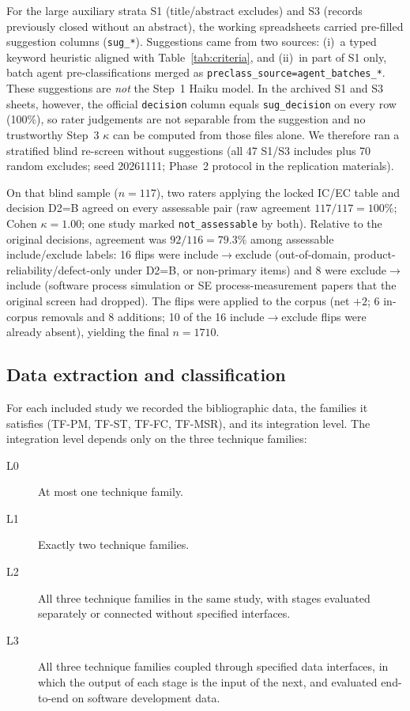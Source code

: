 \documentclass[preprint,12pt,authoryear=false]{elsarticle}
\newcommand{\PM}{TF-PM}
\newcommand{\ST}{TF-ST}
\newcommand{\FC}{TF-FC}
\newcommand{\MSR}{TF-MSR}
\begin{document}
For the large auxiliary strata S1 (title/abstract excludes) and S3 (records previously closed without an abstract), the working spreadsheets carried pre-filled suggestion columns (\texttt{sug\_*}). Suggestions came from two sources: (i)~a typed keyword heuristic aligned with Table~\ref{tab:criteria}, and (ii)~in part of S1 only, batch agent pre-classifications merged as \texttt{preclass\_source=agent\_batches\_*}. These suggestions are \emph{not} the Step~1 Haiku model. In the archived S1 and S3 sheets, however, the official \texttt{decision} column equals \texttt{sug\_decision} on every row (100\%), so rater judgements are not separable from the suggestion and no trustworthy Step~3 $\kappa$ can be computed from those files alone. We therefore ran a stratified blind re-screen without suggestions (all 47 S1/S3 includes plus 70 random excludes; seed 20261111; Phase~2 protocol in the replication materials).

On that blind sample ($n = 117$), two raters applying the locked IC/EC table and decision D2=B agreed on every assessable pair (raw agreement $117/117 = 100\%$; Cohen $\kappa = 1.00$; one study marked \texttt{not\_assessable} by both). Relative to the original decisions, agreement was $92/116 = 79.3\%$ among assessable include/exclude labels: 16 flips were include$\rightarrow$exclude (out-of-domain, product-reliability/defect-only under D2=B, or non-primary items) and 8 were exclude$\rightarrow$include (software process simulation or SE process-measurement papers that the original screen had dropped). The flips were applied to the corpus (net $+2$; 6 in-corpus removals and 8 additions; 10 of the 16 include$\rightarrow$exclude flips were already absent), yielding the final $n = 1710$.

\subsection{Data extraction and classification}\label{sec:classification}

For each included study we recorded the bibliographic data, the families it satisfies (\PM{}, \ST{}, \FC{}, \MSR{}), and its integration level. The integration level depends only on the three technique families:

\begin{description}
\item[L0] At most one technique family.
\item[L1] Exactly two technique families.
\item[L2] All three technique families in the same study, with stages evaluated separately or connected without specified interfaces.
\item[L3] All three technique families coupled through specified data interfaces, in which the output of each stage is the input of the next, and evaluated end-to-end on software development data.
\end{description}
\end{document}
